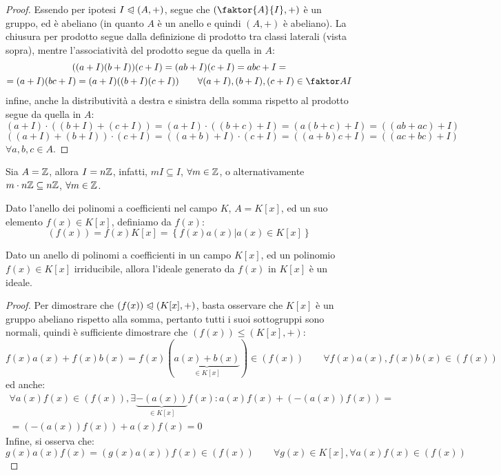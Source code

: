 \documentclass[11pt]{scrartcl}
\begin{document}
\begin{proof}
Essendo per ipotesi $I \trianglelefteqslant (A,+)$, segue che $\left(\faktor{A}{I},+\right)$ è un gruppo, ed è abeliano (in quanto $A$ è un anello e quindi $(A,+)$ è abeliano).
La chiusura per prodotto segue dalla definizione di prodotto tra classi laterali (vista sopra), mentre l'associatività del prodotto segue da quella in $A$:
	\begin{multline*}
		((a + I)(b + I))(c + I) = (ab + I)(c + I) = abc + I = \\
		=(a + I)(bc + I) = (a + I)((b + I)(c + I))
		\qquad 
		\forall (a + I),(b + I),(c + I) \in \faktor AI
		\end{multline*}
infine, anche la distributività a destra e sinistra della somma rispetto al prodotto segue da quella in $A$:
		\[ (a + I) \cdot ((b + I) + (c + I)) = (a + I) \cdot ((b + c) + I) = (a(b + c) + I) = ((ab + ac) + I) 
		\]\[ ((a + I) + (b + I)) \cdot (c + I) = ((a + b) + I) \cdot (c + I) = ((a + b)c + I) = ((ac + bc) + I)
		\]
$\forall a,b,c \in A$.
\end{proof}

\begin{example}
Sia $A=\mathbb Z$, allora $I = n\mathbb Z$, infatti, $mI \subseteq I$, $\forall m \in \mathbb Z$, o alternativamente $m \cdot n\mathbb Z \subseteq n\mathbb Z$, $\forall m \in \mathbb Z$.
\end{example}

\begin{definition}
Dato l'anello dei polinomi a coefficienti nel campo $K$, $A=K[x]$, ed un suo elemento $f(x) \in K[x]$, definiamo  da $f(x)$:
	\[ (f(x)) = f(x)K[x] = \left\{f(x)a(x) | a(x) \in K[x]\right\}
	\]
\end{definition}

\begin{proposition}
\label{p:3.51}
Dato un anello di polinomi a coefficienti in un campo $K[x]$, ed un polinomio $f(x) \in K[x]$ irriducibile, allora l'ideale generato da $f(x)$ in $K[x]$ è un ideale.
\end{proposition}

\begin{proof}
Per dimostrare che $(f(x)) \trianglelefteqslant (K[x], +)$, basta osservare che $K[x]$ è un gruppo abeliano rispetto alla somma, 
pertanto tutti i suoi sottogruppi sono normali, quindi è sufficiente dimostrare che $(f(x)) \leqslant (K[x],+)$:
	\[ f(x)a(x) + f(x)b(x) = f(x)(\underbrace{a(x)+b(x)}_{\in K[x]}) \in (f(x))
	\qquad \forall f(x)a(x),f(x)b(x) \in (f(x))
		\]
ed anche:
	\begin{multline*}
		\forall a(x)f(x) \in (f(x)), \exists \underbrace{-(a(x))}_{\in K[x]}f(x) : a(x)f(x) + (-(a(x))f(x)) = \\ 
		= (-(a(x))f(x)) + a(x)f(x) = 0
	\end{multline*}
Infine, si osserva che:
	\[ g(x)a(x)f(x) = (g(x)a(x))f(x) \in (f(x))
	\qquad
	\forall g(x) \in K[x], \forall a(x)f(x) \in (f(x))
		\]
\end{proof}
\end{document}
